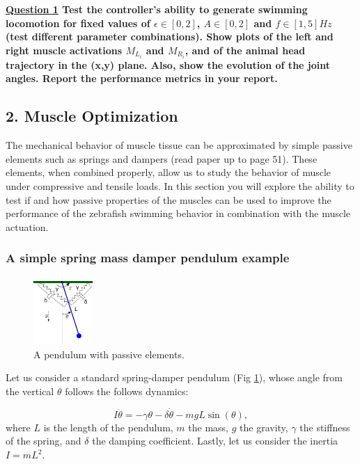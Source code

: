 \documentclass{cmc}
\begin{document}
\textbf{\underline{Question 1} Test the controller's ability to generate swimming locomotion for fixed values of $\epsilon \in [0,2]$, $A \in [0,2]$ and $f \in [1,5] Hz$ (test different parameter combinations). Show plots of the left and right muscle activations $M_{L_i}$ and $M_{R_i}$, and of the animal head trajectory in the (x,y) plane. Also, show the evolution of the joint angles. Report the performance metrics in your report. }


\subsection*{2. Muscle Optimization}
The mechanical behavior of muscle tissue can be approximated by simple passive elements such as springs and dampers (read paper \cite{tytell2014role} up to page 51). These elements, when combined properly, allow us to study the behavior of muscle under compressive and tensile loads. In this section you will explore the ability to test if and how passive properties of the muscles can be used to improve the performance of the zebrafish swimming behavior in combination with the muscle actuation.

\subsubsection*{A simple spring mass damper pendulum example}

\begin{figure}[H]
  \centering \includegraphics[width=0.2\textwidth]{figures/pendulum.pdf}
  \caption{\label{fig:pendulum} A pendulum with passive elements.}
\end{figure}
Let us consider a standard spring-damper pendulum (Fig \ref{fig:pendulum}), whose angle from the vertical $\theta$ follows the follows dynamics:

\begin{equation}
    I \ddot{\theta} = -\gamma \theta - \delta \dot{\theta} - mgL\sin(\theta),
    \label{pendulum}
\end{equation}
where $L$ is the length of the pendulum, $m$ the mass, $g$ the gravity, $\gamma$ the stiffness of the spring, and $\delta$ the damping coefficient. Lastly, let us consider the inertia $I=mL^2$.
\end{document}
